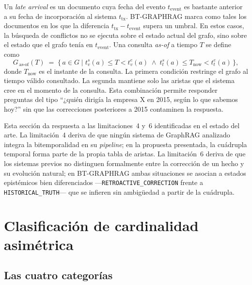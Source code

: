 Un \emph{late arrival} es un documento cuya fecha del evento $t_{\text{event}}$ es bastante anterior a su fecha de incorporación al sistema $t_{\text{tx}}$. BT-GRAPHRAG marca como tales los documentos en los que la diferencia $t_{\text{tx}} - t_{\text{event}}$ supera un umbral. En estos casos, la búsqueda de conflictos no se ejecuta sobre el estado actual del grafo, sino sobre el estado que el grafo tenía en $t_{\text{event}}$. Una consulta \emph{as-of} a tiempo $T$ se define como
\begin{equation}
G_{\,\text{as-of}}(T) \;=\; \bigl\{\, a \in G \;\big|\; t_v^s(a) \le T < t_v^e(a) \;\wedge\; t_t^s(a) \le T_{\text{now}} < t_t^e(a) \,\bigr\},
\end{equation}
donde $T_{\text{now}}$ es el instante de la consulta. La primera condición restringe el grafo al tiempo válido consultado. La segunda mantiene solo las aristas que el sistema cree en el momento de la consulta. Esta combinación permite responder preguntas del tipo ``¿quién dirigía la empresa X en 2015, según lo que sabemos hoy?'' sin que las correcciones posteriores a 2015 contaminen la respuesta.

Esta sección da respuesta a las limitaciones~4 y~6 identificadas en el estado del arte. La limitación~4 deriva de que ningún sistema de GraphRAG analizado integra la bitemporalidad en su \emph{pipeline}; en la propuesta presentada, la cuádrupla temporal forma parte de la propia tabla de aristas. La limitación~6 deriva de que los sistemas previos no distinguen formalmente entre la corrección de un hecho y su evolución natural; en BT-GRAPHRAG ambas situaciones se asocian a estados epistémicos bien diferenciados ---\texttt{RETROACTIVE\_CORRECTION} frente a \texttt{HISTORICAL\_TRUTH}--- que se infieren sin ambigüedad a partir de la cuádrupla.

\section{Clasificación de cardinalidad asimétrica}\label{sec:bt-cardinality}

\subsection{Las cuatro categorías}


